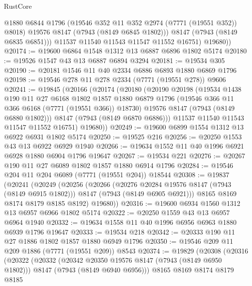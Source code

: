 \begin{lexlean}{RustCore}
\begin{coremodule}
              @1880
              @6844
              @1796
              (@19546 @352 @11 @352 @2974 (@7771 (@19551 @352)) @8018)
              @19576
              @8147
              (@7943 (@8149 @6845 @1802)))
            @8147
            (@7943 (@8149 @6835 @6851)))
          @11537
          @11540
          @11543
          @11547
          @11552
          @16751)
        @19680))
@20174 := @19600 @6864 @1548 @1312 @13 @6887 @6896 @1802 @5174
@20180 := @19526 @1547 @43 @13 @6887 @6894 @3294
@20181 := @19534 @305
@20190 := @20181 @1546 @11 @40 @2334 @6886 @6893 @1880 @6869 @1796
@20198 := @19546 @278 @11 @278 @2334 (@7771 (@19551 @278)) @9606
@20241 := @19845
    (@20166
      (@20174
        (@20180
          (@20190
            @20198
            (@19534
              @1438
              @190
              @11
              @27
              @6168
              @1802
              @1857
              @1880
              @6879
              @1796
              (@19546 @366 @11 @366 @6168 (@7771 (@19551 @366)) @18730)
              @19576
              @8147
              (@7943 (@8149 @6880 @1802)))
            @8147
            (@7943 (@8149 @6870 @6886)))
          @11537
          @11540
          @11543
          @11547
          @11552
          @16751)
        @19680))
@20249 := @19600 @6899 @1554 @1312 @13 @6922 @6931 @1802 @5174
@20250 := @19525 @216
@20256 := @20250 @1553 @43 @13 @6922 @6929 @1940
@20266 := @19634 @1552 @11 @40 @1996 @6921 @6928 @1880 @6904 @1796 @19647
@20267 := @19534 @221
@20276 := @20267 @190 @11 @27 @6089 @1802 @1857 @1880 @6914 @1796
@20284 := @19546 @204 @11 @204 @6089 (@7771 (@19551 @204)) @18544
@20308 := @19837
    (@20241
      (@20249
        (@20256
          (@20266
            (@20276 @20284 @19576 @8147 (@7943 (@8149 @6915 @1802)))
            @8147
            (@7943 (@8149 @6905 @6921)))
          @8165
          @8169
          @8174
          @8179
          @8185
          @8192)
        @19680))
@20316 := @19600 @6934 @1560 @1312 @13 @6957 @6966 @1802 @5174
@20322 := @20250 @1559 @43 @13 @6957 @6964 @1940
@20332 := @19634 @1558 @11 @40 @1996 @6956 @6963 @1880 @6939 @1796 @19647
@20333 := @19534 @218
@20342 := @20333 @190 @11 @27 @1886 @1802 @1857 @1880 @6949 @1796
@20350 := @19546 @209 @11 @209 @1886 (@7771 (@19551 @209)) @8543
@20374 := @19829
    (@20308
      (@20316
        (@20322
          (@20332
            (@20342 @20350 @19576 @8147 (@7943 (@8149 @6950 @1802)))
            @8147
            (@7943 (@8149 @6940 @6956)))
          @8165
          @8169
          @8174
          @8179
          @8185

\end{coremodule}
\end{lexlean}
